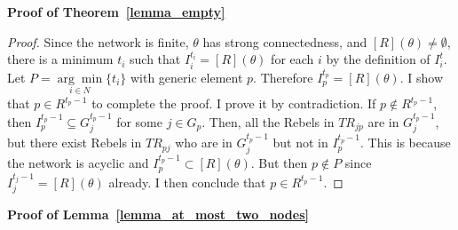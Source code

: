 \documentclass[12pt,letter]{article}
\newtheorem*{lemma*}{Lemma}
\newtheorem{definition}{Definition}[section]
\theoremstyle{definition}
\theoremstyle{remark}
\theoremstyle{claim}
\begin{document}
%
\bigskip
\noindent\textbf{Proof of Theorem~\ref{lemma_empty}}
\begin{proof}



Since the network is finite, $\theta$ has strong connectedness, and $[R](\theta)\neq \emptyset$, there is a minimum $t_i$ such that $I^{t_i}_i=[R](\theta)$ for each $i$ by the definition of $I^t_i$. Let $P=\underset{i\in N}{\arg\min}\{t_i\}$ with generic element $p$. Therefore $I^{t_p}_p=[R](\theta)$. I show that $p\in R^{t_p-1}$ to complete the proof. I prove it by contradiction. If $p\notin R^{t_p-1}$, then $I^{t_p-1}_p\subseteq G^{t_p-1}_j$ for some $j\in G_p$. Then, all the Rebels in $TR_{jp}$ are in $G^{t_p-1}_j$, but there exist Rebels in $TR_{pj}$ who are in $G^{t_p-1}_j$ but not in $I^{t_p-1}_p$. This is because the network is acyclic and $I^{t_p-1}_p\subset [R](\theta)$. But then $p\notin P$ since $I^{t_j-1}_j=[R](\theta)$ already. I then conclude that $p\in R^{t_p-1}$.

\end{proof}





\noindent\textbf{Proof of Lemma~\ref{lemma_at_most_two_nodes}}
   
\end{document}
